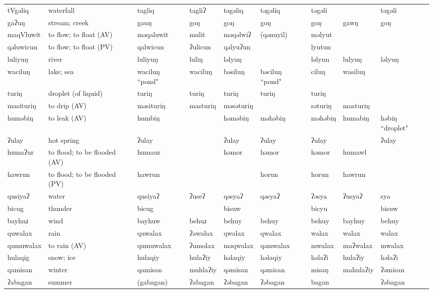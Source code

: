 \begin{landscape}
\begin{longtable}{*{9}{>{\raggedright\arraybackslash}p{}}}
\text{*}tVgəliq & waterfall & tagliq & tagliʔ & təgəliq & təgəliq & təgəli &  & təgəli\\
\text{*}gaʔuŋ & stream; creek & gauŋ & goŋ & goŋ & goŋ & goŋ & gawŋ & goŋ\\
\text{*}maqVluwit & to flow; to float (AV) & məqaluwit & mulit & məqəlwiʔ & (qənuyil) & məlyut &  & \\
\text{*}qəluwicun & to flow; to float (PV) & qalwicun & ʔulicun & qəlyuʔun &  & lyutun &  & \\
\text{*}luliyuŋ & river & luliyuŋ & luliŋ & ləlyuŋ &  & ləlyun & lulyuŋ & ləlyuŋ\\
\text{*}waciluŋ & lake; sea & waciluŋ ``pond" & waciluŋ & bəsiluŋ & bəciluŋ ``pond" & ciluŋ & wasiluŋ & \\
\text{*}turiŋ & droplet (of liquid) & turiŋ & turiŋ & turiŋ & turiŋ & turiŋ &  & \\
\text{*}masituriŋ & to drip (AV) & məsituriŋ & masturiŋ & məsəturiŋ &  & səturiŋ & masturiŋ & \\
\text{*}huməbiŋ & to leak (AV) & humbiŋ &  & həməbiŋ & məhəbiŋ & məhəbiŋ & humabiŋ & həbiŋ ``droplet"\\
\text{*}ʔulay & hot spring & ʔulay &  & ʔulay & ʔulay & ʔulay &  & ʔulay\\
\text{*}humaʔur & to flood; to be flooded (AV) & humaur &  & həmor & həmor & həmor & humawl & \\
\text{*}hawrun & to flood; to be flooded (PV) & hawrun &  &  & horun & horun & hawrun & \\
\text{*}qusiyaʔ & water & qusiyaʔ & ʔuseʔ & qəsyaʔ & qəsyaʔ & ʔəsya & ʔusyaʔ & sya\\
\text{*}bicug & thunder & bicug &  & bisuw &  & bicyu &  & bisuw\\
\text{*}bayhuɹ & wind & bayhuw & behuɹ & behuy & behuy & behuy & bayhuy & behuy\\
\text{*}quwalax & rain & quwalax & ʔawalax & qwalax & qwalax & walax & walax & walax\\
\text{*}qumuwalax & to rain (AV) & qumuwalax & ʔumolax & məqwalax & qəmwalax & mwalax & maʔwalax & mwalax\\
\text{*}hulaqig & snow; ice & hulaqiy & hulaʔiy & həlaqiy & həlaqiy & həlaʔi & hulaʔiy & həlaʔi\\
\text{*}qamisan & winter & qamisan & muhlaʔiy & qəmisan & qəmisan & misaŋ & mahulaʔiy & ʔəmisan\\
\text{*}ʔabagan & summer & (gabagan) & ʔabagan & ʔəbagan & ʔəbagan & bagan &  & ʔəbagan\\

\end{longtable}
\end{landscape}
